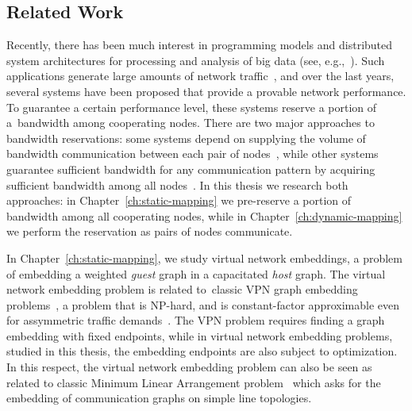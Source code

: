 

\subsection{Related Work}


Recently, there has been much interest in programming models and distributed
system architectures for processing and analysis of big data (see, e.g.,~\cite{mapreduce,nodb,shark}).
Such applications
generate large amounts of network traffic~\cite{orchestra,talk-about,amazonbw},
and over the last years, several systems have been proposed that provide a provable network performance.
To guarantee a certain performance level, these systems reserve a portion of a~bandwidth among cooperating nodes.
There are two major approaches to bandwidth reservations: some systems depend on supplying the volume of bandwidth communication between each pair of nodes~\cite{faircloud,elasticswitch,seawall}, while other systems guarantee sufficient bandwidth for any communication pattern by acquiring sufficient bandwidth among all nodes~\cite{oktopus,secondnet,drl,gatekeeper,proteus}.
In this thesis we research both approaches: in Chapter~\ref{ch:static-mapping} we pre-reserve a portion of bandwidth among all cooperating nodes, while in Chapter~\ref{ch:dynamic-mapping} we perform the reservation as pairs of nodes communicate.

\medskip

In Chapter~\ref{ch:static-mapping}, we study virtual network embeddings, a problem of embedding a weighted \emph{guest} graph in a capacitated \emph{host} graph.
The virtual network embedding problem is related to~classic VPN graph embedding problems~\cite{gupta2001provisioning,vpn1, vpn2, Goyal2008},
a problem that is NP-hard, and is constant-factor approximable even for assymmetric traffic demands~\cite{vpn-apx}.
The VPN problem requires finding a graph embedding with fixed endpoints, while in virtual network embedding problems, studied in this thesis, the embedding endpoints are also subject to optimization.
In this respect, the virtual network embedding problem can also be seen as related to
classic Minimum Linear Arrangement problem~\cite{EvNaRS99,ord-prob} which asks for the
embedding of communication graphs on simple line topologies.

